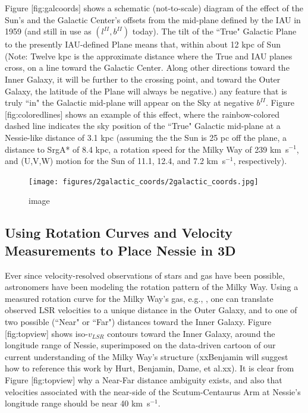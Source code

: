 \documentclass[]{article}
\begin{document}
Figure {[}fig:galcoords{]} shows a schematic (not-to-scale) diagram of
the effect of the Sun's and the Galactic Center's offsets from the
mid-plane defined by the IAU in 1959 (and still in use as
$(l^{II}, b^{II})$ today). The tilt of the ``True" Galactic Plane to the
presently IAU-defined Plane means that, within about 12 kpc of Sun
(Note: Twelve kpc is the approximate distance where the True and IAU
planes cross, on a line toward the Galactic Center. Along other
directions toward the Inner Galaxy, it will be further to the crossing
point, and toward the Outer Galaxy, the latitude of the Plane will
always be negative.) any feature that is truly ``in" the Galactic
mid-plane will appear on the Sky at negative $b^{II}$. Figure
{[}fig:coloredlines{]} shows an example of this effect, where the
rainbow-colored dashed line indicates the sky position of the ``True"
Galactic mid-plane at a Nessie-like distance of 3.1 kpc (assuming the
the Sun is 25 pc off the plane, a distance to SrgA* of 8.4 kpc, a
rotation speed for the Milky Way of 239 km~s$^{-1}$, and (U,V,W) motion
for the Sun of 11.1, 12.4, and 7.2 km~s$^{-1}$, respectively).

\begin{figure}[htbp]
\centering
\texttt{[image: figures/2galactic\_coords/2galactic\_coords.jpg]}
\caption{image}
\end{figure}

\subsection{Using Rotation Curves and Velocity Measurements to Place
Nessie in 3D}

Ever since velocity-resolved observations of stars and gas have been
possible, astronomers have been modeling the rotation pattern of the
Milky Way. Using a measured rotation curve for the Milky Way's gas,
e.g., \citep{McClureGriffiths2007}, one can translate observed LSR
velocities to a unique distance in the Outer Galaxy, and to one of two
possible (``Near" or ``Far") distances toward the Inner Galaxy. Figure
{[}fig:topview{]} shows iso-$v_{LSR}$ contours toward the Inner Galaxy,
around the longitude range of Nessie, superimposed on the data-driven
cartoon of our current understanding of the Milky Way's structure
(xxBenjamin will suggest how to reference this work by Hurt, Benjamin,
Dame, et al.xx). It is clear from Figure {[}fig:topview{]} why a
Near-Far distance ambiguity exists, and also that velocities associated
with the near-side of the Scutum-Centaurus Arm at Nessie's longitude
range should be near 40 km~s$^{-1}$.
\end{document}
